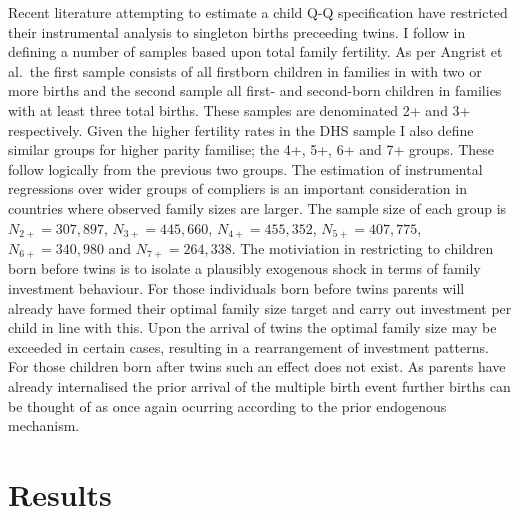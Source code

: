 \documentclass{article}[11pt,subeqn]
\begin{document}
\begin{spacing}{1.5}
Recent literature attempting to estimate a child Q-Q specification have restricted their instrumental analysis to singleton births preceeding 
twins.  I follow \citet{Angristetal2010} in defining a number of samples based upon total family fertility.  As per Angrist et al.\ the first sample 
consists of all firstborn children in families in with two or more births and the second sample all first- and second-born children in families 
with at least three total births.  These samples are denominated 2+ and 3+ respectively.  Given the higher fertility rates in the DHS sample I also 
define similar groups for higher parity familise; the 4+, 5+, 6+ and 7+ groups.  These follow logically from the previous two groups.  The estimation 
of instrumental regressions over wider groups of compliers is an important consideration in countries where observed family sizes are larger.  The 
sample size of each group is $N_{2+}= 307,897$, $N_{3+}=445,660$, $N_{4+}= 455,352$, $N_{5+}=407,775$, $N_{6+}=340,980$ and $N_{7+}=264,338$.  
The motiviation 
in restricting to children born before twins is to isolate a plausibly exogenous shock in terms of family investment behaviour.  For those 
individuals born before twins parents will already have formed their optimal family size target and carry out investment per child in line 
with this.  Upon the arrival of twins the optimal family size may be exceeded in certain cases, resulting in a rearrangement of investment 
patterns.  For those children born after twins such an effect does not exist.  As parents have already internalised the prior arrival of the 
multiple birth event further births can be thought of as once again ocurring according to the prior endogenous mechanism.

  
\section{Results}
\label{scn:results}

\end{spacing}
\end{document}
